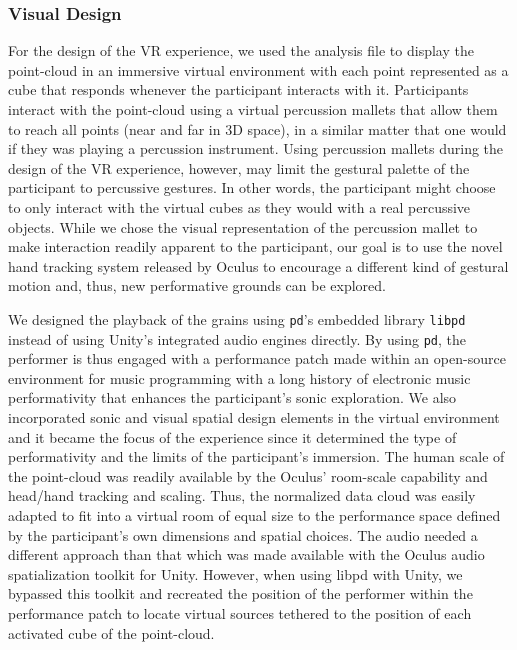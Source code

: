 \documentclass{nime-alternate}
\begin{document}
\subsubsection{Visual Design}

For the design of the VR experience, we used the analysis file to display the point-cloud in an immersive virtual environment with each point represented as a cube that responds whenever the participant interacts with it. Participants interact with the point-cloud using a virtual percussion mallets that allow them to reach all points (near and far in 3D space), in a similar matter that one would if they was playing a percussion instrument. Using percussion mallets during the design of the VR experience, however, may limit the gestural palette of the participant to percussive gestures. In other words, the participant might choose to only interact with the virtual cubes as they would with a real percussive objects. While we chose the visual representation of the percussion mallet to make interaction readily apparent to the participant, our goal is to use the novel hand tracking system released by Oculus to encourage a different kind of gestural motion and, thus, new performative grounds can be explored. 

We designed the playback of the grains using \texttt{pd}’s embedded library \texttt{libpd} instead of using Unity’s integrated audio engines directly. By using \texttt{pd}, the performer is thus engaged with a performance patch made within an open-source environment for music programming with a long history of electronic music performativity that enhances the participant’s sonic exploration. We also incorporated sonic and visual spatial design elements in the virtual environment and it became the focus of the experience since it determined the type of performativity and the limits of the participant’s immersion. The human scale of the point-cloud was readily available by the Oculus’ room-scale capability and head/hand tracking and scaling. Thus, the normalized data cloud was easily adapted to fit into a virtual room of equal size to the performance space defined by the participant's own dimensions and spatial choices. The audio needed a different approach than that which was made available with the Oculus audio spatialization toolkit for Unity. However, when using libpd with Unity, we bypassed this toolkit and recreated the position of the performer within the performance patch to locate virtual sources tethered to the position of each activated cube of the point-cloud. 
\end{document}
